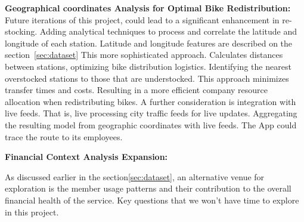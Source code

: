 \documentclass[12pt, a4paper]{article}
\begin{document}
    \textbf{Geographical coordinates Analysis for Optimal Bike Redistribution:} \newline
    Future iterations of this project, could lead to a significant enhancement in re-stocking.\newline
    Adding analytical techniques to process and correlate the latitude and longitude of each station. Latitude and longitude features are described on the section~\ref{sec:dataset}\newline
    This more sophisticated approach. Calculates distances between stations, optimizing bike distribution logistics.\newline
    Identifying the nearest overstocked stations to those that are understocked. This approach minimizes transfer times and costs. Resulting in a more efficient company resource allocation when redistributing bikes.\newline
    A further consideration is integration with live feeds. That is, live processing city traffic feeds for live updates. Aggregating the resulting model from geographic coordinates with live feeds. The App could trace the route to its employees.

    \textbf{Financial Context Analysis Expansion:}

    As discussed earlier in the section\ref{sec:dataset}, an alternative venue for exploration is the member usage patterns and their contribution to the overall financial health of the service.\newline
    \newline Key questions that we won't have time to explore in this project.
\end{document}
